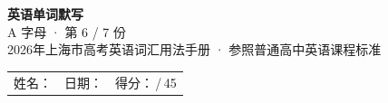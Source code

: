 \documentclass[10pt,a4paper]{article}
\begin{document}
\pagestyle{plain}

\begin{center}
{\LARGE\bfseries 英语单词默写}\\[0.22em]
{\large A 字母 · 第 6 / 7 份}\\[0.18em]
{\small 2026年上海市高考英语词汇用法手册 · 参照普通高中英语课程标准}
\end{center}

\vspace{0.25em}
\noindent\begin{tabular}{@{}p{}@{}p{}@{}p{}@{}}
姓名：\underline{\hspace{2.0cm}} & 日期：\underline{\hspace{2.0cm}} & 得分：\underline{\hspace{1.3cm}}\,/\,45 \\
\end{tabular}

\vspace{0.3em}

\vspace{0.08em}
\end{document}
